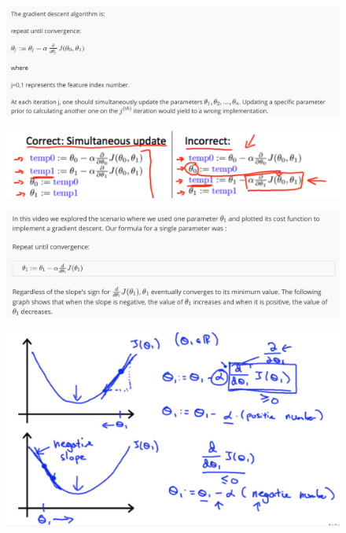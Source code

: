 \documentclass[12pt, A4,onecolumn]{article} %
\begin{document}
\begin{figure}[H]
	\centering
	\includegraphics[width=1\textwidth]{./Imagenes/gradient4}
\end{figure}

\begin{figure}[H]
	\centering
	\includegraphics[width=1\textwidth]{./Imagenes/gradient5}
\end{figure}

\begin{figure}[H]
	\centering
	\includegraphics[width=1\textwidth]{./Imagenes/gradient6}
\end{figure}

\begin{figure}[H]
	\centering
	\includegraphics[width=1\textwidth]{./Imagenes/gradient7}
\end{figure}
\end{document}
